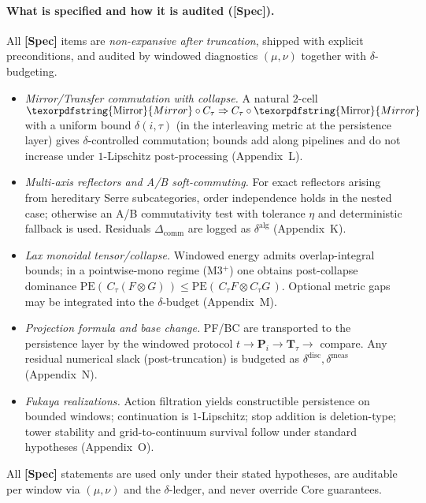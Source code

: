 \documentclass[11pt]{article}
\numberwithin{equation}{section}
\theoremstyle{plain}
\theoremstyle{definition}
\theoremstyle{remark}
\theoremstyle{plain}
\theoremstyle{definition}
\newcommand{\PE}{\mathrm{PE}}
\numberwithin{equation}{section}
\theoremstyle{definition}
\DeclareRobustCommand{\Mirror}{\texorpdfstring{\ensuremath{\operatorname{Mirror}}}{Mirror}}
\numberwithin{equation}{section}
\theoremstyle{plain}
\theoremstyle{definition}
\theoremstyle{remark}
\begin{document}
\paragraph{What is specified and how it is audited (\textup{[Spec]}).}
All \textbf{[Spec]} items are \emph{non-expansive after truncation}, shipped with explicit preconditions, and audited by windowed diagnostics \((\mu,\nu)\) together with \(\delta\)-budgeting.
\begin{itemize}
  \item \emph{Mirror/Transfer commutation with collapse.} A natural \(2\)-cell \(\Mirror\circ C_\tau \Rightarrow C_\tau\circ\Mirror\) with a uniform bound \(\delta(i,\tau)\) (in the interleaving metric at the persistence layer) gives \(\delta\)-controlled commutation; bounds add along pipelines and do not increase under \(1\)-Lipschitz post-processing (Appendix~L).
  \item \emph{Multi-axis reflectors and A/B soft-commuting.} For exact reflectors arising from hereditary Serre subcategories, order independence holds in the nested case; otherwise an A/B commutativity test with tolerance \(\eta\) and deterministic fallback is used. Residuals \(\Delta_{\mathrm{comm}}\) are logged as \(\delta^{\mathrm{alg}}\) (Appendix~K).
  \item \emph{Lax monoidal tensor/collapse.} Windowed energy admits overlap-integral bounds; in a pointwise-mono regime (M3\(^{+}\)) one obtains post-collapse dominance \(\PE(\,C_\tau(F\otimes G)\,)\le \PE(\,C_\tau F\otimes C_\tau G\,)\). Optional metric gaps may be integrated into the \(\delta\)-budget (Appendix~M).
  \item \emph{Projection formula and base change.} PF/BC are transported to the persistence layer by the windowed protocol \(t\to \mathbf{P}_i\to \mathbf{T}_\tau\to\) compare. Any residual numerical slack (post-truncation) is budgeted as \(\delta^{\mathrm{disc}},\delta^{\mathrm{meas}}\) (Appendix~N).
  \item \emph{Fukaya realizations.} Action filtration yields constructible persistence on bounded windows; continuation is \(1\)-Lipschitz; stop addition is deletion-type; tower stability and grid-to-continuum survival follow under standard hypotheses (Appendix~O).
\end{itemize}
All \textbf{[Spec]} statements are used only under their stated hypotheses, are auditable per window via \((\mu,\nu)\) and the \(\delta\)-ledger, and never override Core guarantees.
\end{document}
